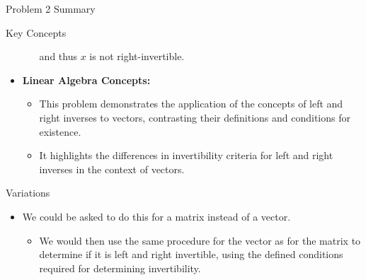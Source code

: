 \begin{summary}{Problem 2 Summary}
\begin{statement}{Key Concepts}
\begin{itemize}
\begin{itemize}
                and thus $x$ is not right-invertible.
            \end{itemize}
            \item \textbf{Linear Algebra Concepts:}
            \begin{itemize}
                \item This problem demonstrates the application of the concepts of left and right inverses to vectors, contrasting their definitions and conditions for existence.
                \item It highlights the differences in invertibility criteria for left and right inverses in the context of vectors.
            \end{itemize}
        \end{itemize}
    \end{statement}
    \begin{statement}{Variations}
        \begin{itemize}
            \item We could be asked to do this for a matrix instead of a vector.
            \begin{itemize}
                \item We would then use the same procedure for the vector as for the matrix to determine if it is left and right invertible, using the defined conditions required for determining
                invertibility.
            \end{itemize}
        \end{itemize}
    \end{statement}
\end{summary}

